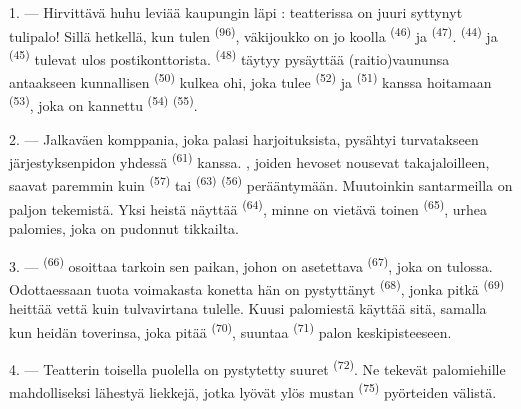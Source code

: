 1. --- Hirvittävä huhu leviää kaupungin läpi : teatterissa on juuri syttynyt
tulipalo! Sillä hetkellä, kun tulen  \textsuperscript{(96)},
väkijoukko on jo koolla  \textsuperscript{(46)} ja
 \textsuperscript{(47)}. 
\textsuperscript{(44)} ja  \textsuperscript{(45)} tulevat
ulos postikonttorista.  \textsuperscript{(48)}
täytyy pysäyttää (raitio)vaununsa antaakseen kunnallisen
 \textsuperscript{(50)} kulkea ohi, joka tulee
 \textsuperscript{(52)} ja 
\textsuperscript{(51)} kanssa hoitamaan 
\textsuperscript{(53)}, joka on kannettu 
\textsuperscript{(54)}  \textsuperscript{(55)}.

2. --- Jalkaväen komppania, joka palasi harjoituksista, pysähtyi turvatakseen
järjestyksenpidon yhdessä 
\textsuperscript{(61)} kanssa. , joiden hevoset nousevat
takajaloilleen, saavat paremmin kuin  \textsuperscript{(57)}
tai  \textsuperscript{(63)} 
\textsuperscript{(56)} perääntymään. Muutoinkin santarmeilla on paljon tekemistä.
Yksi heistä näyttää  \textsuperscript{(64)},
minne on vietävä toinen  \textsuperscript{(65)}, urhea
palomies, joka on pudonnut tikkailta.

3. ---  \textsuperscript{(66)} osoittaa tarkoin sen paikan, johon
on asetettava  \textsuperscript{(67)}, joka on tulossa.
Odottaessaan tuota voimakasta konetta hän on pystyttänyt 
\textsuperscript{(68)}, jonka pitkä  \textsuperscript{(69)}
heittää vettä kuin tulvavirtana tulelle. Kuusi palomiestä käyttää sitä, samalla
kun heidän toverinsa, joka pitää  \textsuperscript{(70)},
suuntaa  \textsuperscript{(71)} palon keskipisteeseen.

4. --- Teatterin toisella puolella on pystytetty suuret 
\textsuperscript{(72)}. Ne tekevät palomiehille mahdolliseksi lähestyä liekkejä,
jotka lyövät ylös mustan  \textsuperscript{(75)} pyörteiden
välistä.

\VUsaut{5.0mm}
\VUsaut{3.4mm}

